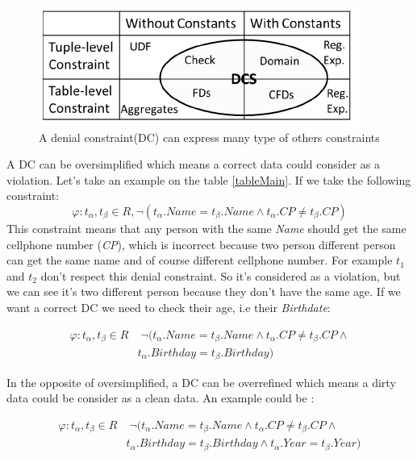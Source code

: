 \documentclass[letterpaper, 12pt]{report}
\begin{document}
\begin{figure}
	\centering
	\includegraphics[scale=1]{img/quadran.png}
	\caption{A denial constraint(DC) can express many type of others constraints}
\end{figure}
A DC can be oversimplified which means a correct data could consider as a violation. Let's take an example on the table \ref{tableMain}. If we take the following constraint:
$$ \varphi : t_\alpha,t_\beta \in R, \neg(t_\alpha.Name = t_\beta.Name \wedge t_\alpha.CP \neq t_\beta.CP)$$
This constraint means that any person with the same \emph{Name} should get the same cellphone number (\emph{CP}), which is incorrect because two person different person can get the same name and of course different cellphone number. For example $t_1$ and $t_2$ don't respect this denial constraint. So it's considered as a violation, but we can see it's two different person because they don't have the same age. If we want a correct DC we need to check their age, i.e their \emph{Birthdate}:

\begin{displaymath}
  \begin{split}
    \varphi : t_\alpha,t_\beta \in R &\; \neg(t_\alpha.Name = t_\beta.Name \wedge t_\alpha.CP \neq t_\beta.CP \wedge \\
    & t_\alpha.Birthday = t_\beta.Birthday)
  \end{split}
\end{displaymath}

In the opposite of oversimplified, a DC can be overrefined which means a dirty data could be consider as a clean data. An example could be :

\begin{displaymath}
  \begin{split}
    \varphi : t_\alpha,t_\beta \in R &\; \neg(t_\alpha.Name = t_\beta.Name \wedge t_\alpha.CP \neq t_\beta.CP \wedge \\
    & t_\alpha.Birthday = t_\beta.Birthday \wedge t_\alpha.Year = t_\beta.Year)
  \end{split}
\end{displaymath}
\end{document}
